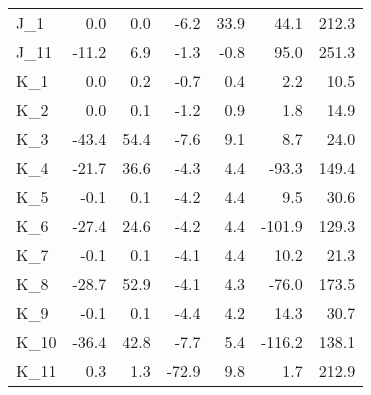 \begin{tabular}{lrrrrrr}
J\_1 & 0.0 & 0.0 & -6.2 & 33.9 & 44.1 & 212.3 \\
J\_11 & -11.2 & 6.9 & -1.3 & -0.8 & 95.0 & 251.3 \\
K\_1 & 0.0 & 0.2 & -0.7 & 0.4 & 2.2 & 10.5 \\
K\_2 & 0.0 & 0.1 & -1.2 & 0.9 & 1.8 & 14.9 \\
K\_3 & -43.4 & 54.4 & -7.6 & 9.1 & 8.7 & 24.0 \\
K\_4 & -21.7 & 36.6 & -4.3 & 4.4 & -93.3 & 149.4 \\
K\_5 & -0.1 & 0.1 & -4.2 & 4.4 & 9.5 & 30.6 \\
K\_6 & -27.4 & 24.6 & -4.2 & 4.4 & -101.9 & 129.3 \\
K\_7 & -0.1 & 0.1 & -4.1 & 4.4 & 10.2 & 21.3 \\
K\_8 & -28.7 & 52.9 & -4.1 & 4.3 & -76.0 & 173.5 \\
K\_9 & -0.1 & 0.1 & -4.4 & 4.2 & 14.3 & 30.7 \\
K\_10 & -36.4 & 42.8 & -7.7 & 5.4 & -116.2 & 138.1 \\
K\_11 & 0.3 & 1.3 & -72.9 & 9.8 & 1.7 & 212.9 \\
\bottomrule
\end{tabular}

